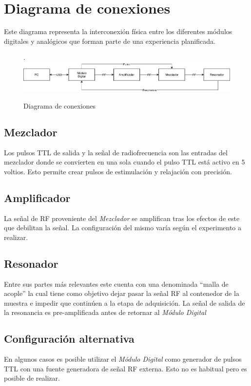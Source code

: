 \section{Diagrama de conexiones}

Este diagrama representa la interconexi\'on f\'isica entre los diferentes m\'odulos digitales y anal\'ogicos que forman
parte de una experiencia planificada.

\begin{figure}[!htb].
    \includegraphics[width=\linewidth]{../figures/d4.jpg}
    \caption{Diagrama de conexiones}
    \label{fig:d4}
\end{figure}
  

\subsection{Mezclador}

Los pulsos TTL de salida y la se\~nal de radiofrecuencia son las entradas del mezclador
donde se convierten en una sola cuando el pulso TTL est\'a activo en 5 voltios.
Esto permite crear pulsos de estimulaci\'on y relajaci\'on con precisi\'on.

\subsection{Amplificador}
La se\~nal de RF proveniente del \textit{Mezclador} se amplifican tras los efectos de este que debilitan la se\~nal.
La configuraci\'on del mismo var\'ia seg\'un el experimento a realizar.

\subsection{Resonador}
Entre sus partes m\'as relevantes este cuenta con una denominada \enquote{malla de acople} la cual
tiene como objetivo dejar pasar la se\~nal RF al contenedor de la muestra e impedir
que contin\'uen a la etapa de adquisici\'on.
La se\~nal de salida de la resonancia es pre-amplificada antes de retornar al \textit{M\'odulo Digital}

\subsection{Configuraci\'on alternativa}
En algunos casos es posible utilizar el \textit{M\'odulo Digital} como generador de pulsos TTL con una fuente
generadora de se\~nal RF externa. Esto no es habitual pero es posible de realizar.

\newpage
